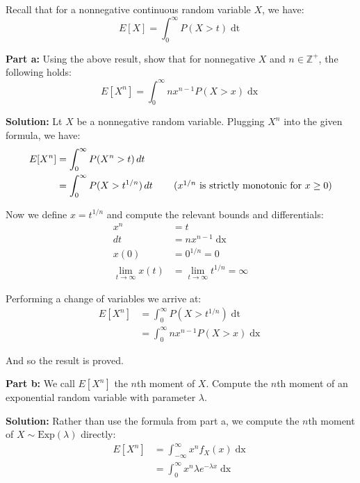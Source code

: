 \documentclass{article}
\begin{document}
Recall that for a nonnegative continuous random variable $X$, we have:
\begin{equation*}
    E[X]=\int_0^\infty P(X>t)\mathop{dt}
\end{equation*}

\noindent\textbf{Part a:} Using the above result, show that for nonnegative $X$ and $n\in\mathbb Z^+$, the following holds:
\begin{equation*}
    E[X^n]=\int_0^\infty nx^{n-1}P(X>x)\mathop{dx}
\end{equation*}

\noindent\textbf{Solution:} Lt $X$ be a nonnegative random variable. Plugging $X^n$ into the given formula, we have:
\begin{align*}
    E[X^n]&=\int_0^\infty P(X^n>t)\mathop{dt}\\
    &=\int_0^\infty P(X>t^{1/n})\mathop{dt}\tag{$x^{1/n}$ is strictly monotonic for $x\ge0$}
\end{align*}

Now we define $x=t^{1/n}$ and compute the relevant bounds and differentials:
\begin{align*}
    x^n&=t\\
    dt&=nx^{n-1}\mathop{dx}\\
    x(0)&=0^{1/n}=0\\
    \lim_{t\to\infty} x(t)&=\lim_{t\to\infty} t^{1/n}=\infty
\end{align*}

Performing a change of variables we arrive at:
\begin{align*}
    E[X^n]&=\int_0^\infty P(X>t^{1/n})\mathop{dt}\\
    &=\int_0^\infty nx^{n-1}P(X>x)\mathop{dx}\tag{change of variables}
\end{align*}

And so the result is proved.
\bigskip

\noindent\textbf{Part b:} We call $E[X^n]$ the $n$th moment of $X$. Compute the $n$th moment of an exponential random variable with parameter $\lambda$.
\bigskip

\noindent\textbf{Solution:} Rather than use the formula from part a, we compute the $n$th moment of $X\sim\text{Exp}(\lambda)$ directly:
\begin{align*}
    E[X^n]&=\int_{-\infty}^\infty x^nf_X(x)\mathop{dx}\tag{def. of expected value}\\
    &=\int_0^\infty x^n\lambda e^{-\lambda x}\mathop{dx}\tag{pdf of exponential variable}
\end{align*}
\end{document}
